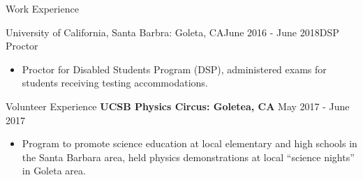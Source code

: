 \documentclass{resume} %
\begin{document}
\begin{rSection}{Work Experience}
\begin{rSubsection}{University of California, Santa Barbra: Goleta, CA}{June 2016 - June 2018}{DSP Proctor}{}
\begin{itemize}
    \item Proctor for Disabled Students Program (DSP), administered exams for students receiving testing accommodations.
\end{itemize}
\end{rSubsection}

\end{rSection}


\begin{rSection}{Volunteer Experience}
{\bf UCSB Physics Circus: Goletea, CA} \hfill {May 2017 - June 2017}
\begin{itemize}
    \item Program to promote science education at local elementary and high schools in the Santa Barbara area, held physics demonstrations at local “science nights” in Goleta area.
\end{itemize}
\end{rSection}
\end{document}
